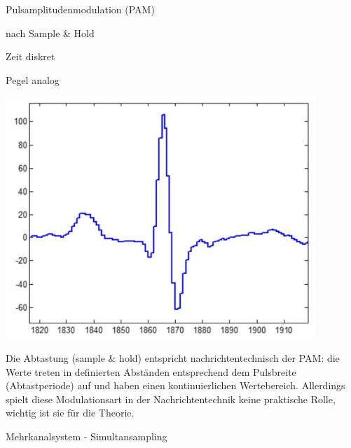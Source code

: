 \documentclass[a4paper]{article}
\begin{document}
\begin{multicols}{3}
  Pulsamplitudenmodulation (PAM)

  \begin{itemize*}
    \item nach Sample \& Hold
    \begin{itemize*}
      \item Zeit diskret
      \item Pegel analog
    \end{itemize*}
    \item \includegraphics[width=.5\linewidth]{Assets/Biosignalverarbeitung-Pulsamplitudenmodulation.png}
    \item Die Abtastung (sample \& hold) entspricht nachrichtentechnisch der PAM: die Werte treten in definierten Abständen entsprechend dem Pulsbreite (Abtastperiode) auf und haben einen kontinuierlichen Wertebereich. Allerdings spielt diese Modulationsart in der Nachrichtentechnik keine praktische Rolle, wichtig ist sie für die Theorie.
  \end{itemize*}

  Mehrkanalsystem - Simultansampling


\end{multicols}
\end{document}
